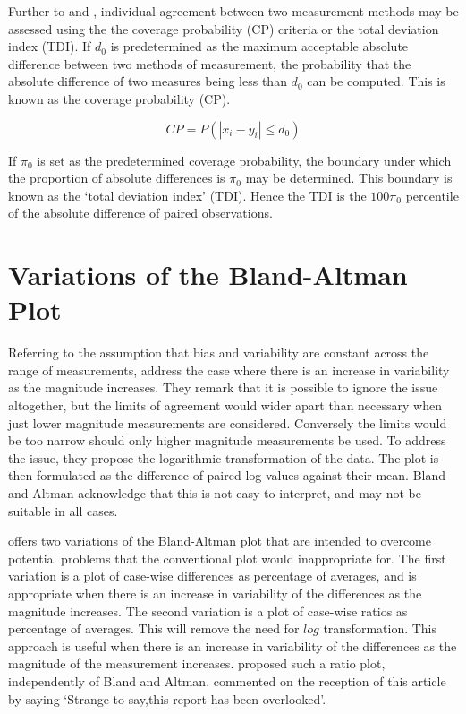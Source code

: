 \documentclass[12pt, a4paper]{report}
\theoremstyle{plain}
\theoremstyle{definition}
\theoremstyle{remark}
\begin{document}
Further to  \citet{lin2000} and \citet{lin2002}, individual agreement between two measurement methods may be
assessed using the the coverage probability (CP) criteria or the total deviation index (TDI). If $d_{0}$ is predetermined as the maximum acceptable absolute difference between two methods of measurement, the probability that the absolute difference of two measures being less than $d_{0}$ can be computed. This is known as the coverage probability (CP).

\begin{equation}
CP = P(|x_{i} - y_{i}| \leq d_{0})
\end{equation}

If $\pi_{0}$ is set as the predetermined coverage probability, the
boundary under which the proportion of absolute differences is
$\pi_{0}$ may be determined. This boundary is known as the `total
deviation index' (TDI). Hence the TDI is the $100\pi_{0}$
percentile of the absolute difference of paired observations.

\section{Variations of the Bland-Altman Plot} Referring to the
assumption that bias and variability are constant across the range
of measurements, \citet{BA99} address the case where there is an
increase in variability as the magnitude increases. They remark
that it is possible to ignore the issue altogether, but the limits
of agreement would wider apart than necessary when just lower
magnitude measurements are considered. Conversely the limits would
be too narrow should only higher magnitude measurements be used.
To address the issue, they propose the logarithmic transformation
of the data. The plot is then formulated as the difference of
paired log values against their mean. Bland and Altman acknowledge
that this is not easy to interpret, and may not be suitable in
all cases.

\citet{BA99} offers two variations of the Bland-Altman plot that
are intended to overcome potential problems that the conventional
plot would inappropriate for. The first variation is a plot of
case-wise differences as percentage of averages, and is
appropriate when there is an increase in variability of the
differences as the magnitude increases. The second variation is a
plot of case-wise ratios as percentage of averages. This will
remove the need for $log$ transformation. This approach is useful
when there is an increase in variability of the differences as the
magnitude of the measurement increases. \citet{Eksborg} proposed
such a ratio plot, independently of Bland and Altman.
\citet{Dewitte} commented on the reception of this article by
saying `Strange to say,this report has been overlooked'.
\end{document}
